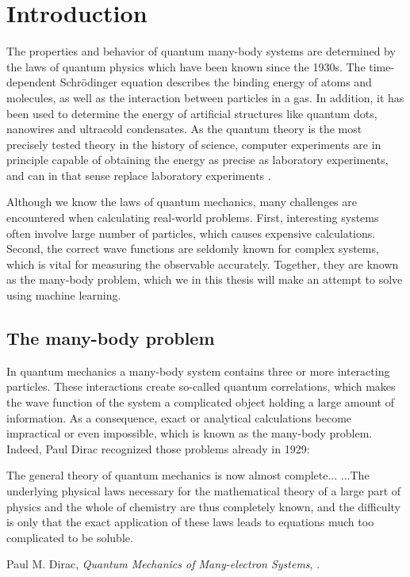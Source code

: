 \chapter{Introduction}
The properties and behavior of quantum many-body systems are determined by the laws of quantum physics which have been known since the 1930s. The time-dependent Schrödinger equation describes the binding energy of atoms and molecules, as well as the interaction between particles in a gas. In addition, it has been used to determine the energy of artificial structures like quantum dots, nanowires and ultracold condensates. As the quantum theory is the most precisely tested theory in the history of science, computer experiments are in principle capable of obtaining the energy as precise as laboratory experiments, and can in that sense replace laboratory experiments \cite{odom_new_2006}. 

Although we know the laws of quantum mechanics, many challenges are encountered when calculating real-world problems. First, interesting systems often involve large number of particles, which causes expensive calculations. Second, the correct wave functions are seldomly known for complex systems, which is vital for measuring the observable accurately. Together, they are known as the many-body problem, which we in this thesis will make an attempt to solve using machine learning.

\section{The many-body problem}
In quantum mechanics a many-body system contains three or more interacting particles. These interactions create so-called quantum correlations, which makes the wave function of the system a complicated object holding a large amount of information. As a consequence, exact or analytical calculations become impractical or even impossible, which is known as the many-body problem. Indeed, Paul Dirac recognized those problems already in 1929:

\begin{shadequote}{
		The general theory of quantum mechanics is now almost complete... ...The underlying physical laws necessary for the mathematical theory of a large part of physics and the whole of chemistry are thus completely known, and the difficulty is only that the exact application of these laws leads to equations much too complicated to be soluble. \par Paul M. Dirac, \emph{Quantum Mechanics of Many-electron Systems}, \cite{dirac_paul_adrien_maurice_quantum_1929}.}
\end{shadequote}

